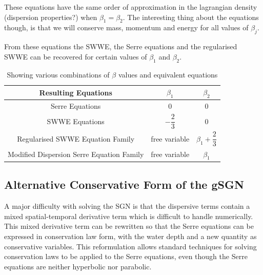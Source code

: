 \documentclass[10pt]{article}
\begin{document}
These equations have the same order of approximation in the lagrangian density (dispersion properties?) when $\beta_1 = \beta_2$. The interesting thing about the equations though, is that we will conserve mass, momentum and energy for all values of $\beta_j$. 

From these equations the SWWE, the Serre equations and the regularised SWWE \cite{Clamond-Dutykh-2018-237} can be recovered for certain values of $\beta_1$ and $\beta_2$. 


\begin{table}
	\centering
	\begin{tabular}{c | c | c}
		Resulting Equations &$\beta_1$ & $\beta_2$  \\
		\hline 
		Serre Equations & $0$ & $0$ \\
		SWWE Equations & $-\dfrac{2}{3}$ & $0$ \\
		Regularised SWWE Equation Family & free variable & $\beta_1 + \dfrac{2}{3}$  \\
		Modified Dispersion Serre Equation Family & free variable & $\beta_1$
	\end{tabular}
	\caption{Showing various combinations of $\beta$ values and equivalent equations}
\end{table}

\subsection{Alternative Conservative Form of the gSGN}

A major difficulty with solving the SGN is that the dispersive terms contain a mixed spatial-temporal derivative term which is difficult to handle numerically. This mixed derivative term can be rewritten  so that the Serre equations can be expressed in conservation law form, with the water depth and a new quantity as conservative variables. This reformulation allows standard techniques for solving conservation laws to be applied to the Serre equations, even though the Serre equations are neither hyperbolic nor parabolic.
\end{document}

